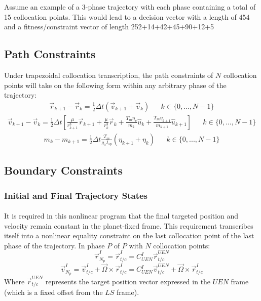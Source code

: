Assume an example of a 3-phase trajectory with each phase containing a total of 15 collocation points. This would lead to a decision vector with a length of 454 and a fitness/constraint vector of length  252+14+42+45+90+12+5


\subsection{Path Constraints}
Under trapezoidal collocation transcription, the path constraints of $N$ collocation points will take on the following form within any arbitrary phase of the trajectory:
\begin{align}
\vec{r}_{k+1} - \vec{r}_k = 
\frac{1}{2}\Delta t ( \vec{v}_{k+1} + \vec{v}_k ) &&
k \in \{ 0, ... , N-1 \}
\end{align}
\begin{align}
\vec{v}_{k+1} - \vec{v}_k = 
\frac{1}{2}\Delta t \left[ \frac{\mu }{r_{k+1}^3}\vec{r}_{k+1} + \frac{\mu }{r_{k}^3}\vec{r}_{k} +  \frac{T_m \eta_k}{m_k} \hat{u}_{k} + \frac{T_m \eta_{k+1}}{m_{k+1}} \hat{u}_{k+1} \right] &&
k \in \{ 0, ... , N-1 \}
\end{align}
\begin{align}
m_{k} - m_{k+1} = 
\frac{1}{2}\Delta t \frac{T_m}{g_0 I_{sp}} ( \eta_{k+1} + \eta_{k} ) &&
k \in \{ 0, ... , N-1 \}
\end{align}
\subsection{Boundary Constraints}
\subsubsection{Initial and Final Trajectory States}
\paragraph{}
It is required in this nonlinear program that the final targeted position and velocity remain constant in the planet-fixed frame. This requirement transcribes itself into a nonlinear equality constraint on the last collocation point of the last phase of the trajectory. In phase $P$ of $P$ with $N$ collocation points:
\begin{equation}
\vec{r}_{N_{p}}^{I} = \vec{r}_{t/c}^{I} = C_{\mathit{UEN}}^{I} \vec{r}_{t/c}^{\mathit{UEN}}
\end{equation}
\begin{equation}
\vec{v}_{N_{p}}^{I} = \vec{v}_{t/c}^{I} + \vec{\Omega} \times \vec{r}_{t/c}^{I} = C_{\mathit{UEN}}^{I} \vec{v}_{t/c}^{\mathit{UEN}} + \vec{\Omega} \times \vec{r}_{t/c}^{I}
\end{equation}
Where  $\vec{r}_{t/c}^{\mathit{UEN}}$ represents the target position vector expressed in the $\mathit{UEN}$ frame (which is a fixed offset from the $\mathit{LS}$ frame).
